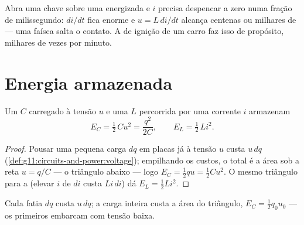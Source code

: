 \begin{remark}\label{rem:g12:rc-rl-circuits:spark}
Abra uma chave sobre uma  energizada e $i$ precisa despencar a zero numa fração
de milissegundo: $di/dt$ fica enorme e $u = L\,di/dt$ alcança centenas ou milhares de
 --- uma faísca salta o contato. A  de ignição de um carro faz isso de
propósito, milhares de vezes por minuto.
\end{remark}

\section{Energia armazenada}

\begin{proposition}\label{prop:g12:rc-rl-circuits:energy}
Um  $C$ carregado à tensão $u$ e uma  $L$ percorrida por uma corrente
$i$ armazenam
\[
E_C = \tfrac12\,C u^2 = \frac{q^2}{2C},
\qquad
E_L = \tfrac12\,L i^2 .
\]
\end{proposition}

\begin{proof}
Pousar uma pequena carga $dq$ em placas já à tensão $u$ custa $u\,dq$
(\cref{def:g11:circuits-and-power:voltage}); empilhando os custos, o total é a área sob
a reta $u = q/C$ --- o triângulo abaixo --- logo $E_C = \tfrac12 qu = \tfrac12 Cu^2$. O
mesmo triângulo para a  (elevar $i$ de $di$ custa $Li\,di$) dá
$E_L = \tfrac12 Li^2$.
\end{proof}

\begin{omfigure}

{\small Cada fatia $dq$ custa $u\,dq$; a carga inteira custa a área do triângulo,
$E_C = \tfrac12 q_0 u_0$ --- os primeiros  embarcam com tensão baixa.}
\end{omfigure}

